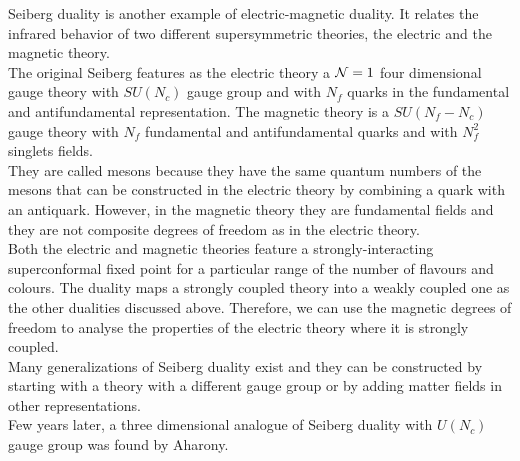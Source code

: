 Seiberg duality is another example of electric-magnetic duality.
It relates the infrared behavior of two different supersymmetric theories, the electric and the magnetic theory.\\
The  original Seiberg features as the electric theory a $\mathcal{N}=1$ four dimensional gauge theory with $SU(N_c)$ gauge group and with $N_f$ quarks in the fundamental and antifundamental representation.
The magnetic theory is a $SU(N_f-N_c)$ gauge theory with $N_f$ fundamental and antifundamental quarks and with $N_f^2$ singlets fields. \\
They are called mesons because they have the same quantum numbers of the mesons that can be constructed in the electric theory by combining a quark with an antiquark. 
However, in the magnetic theory they are fundamental fields and they are not composite degrees of freedom as in the electric theory.\\
Both the electric and magnetic theories feature a strongly-interacting superconformal fixed point for a particular range of the number of flavours and colours. 
The duality maps a strongly coupled theory into a weakly coupled one as the other dualities discussed above. 
Therefore, we can use the magnetic degrees of freedom to analyse the properties of the electric theory where it is strongly coupled.\\
Many generalizations of Seiberg duality exist and they can be constructed by starting with a theory with a different gauge group or by adding matter fields in other representations.
\\
Few years later, a three dimensional analogue of Seiberg duality with $U(N_c)$ gauge group was found by Aharony.\\

